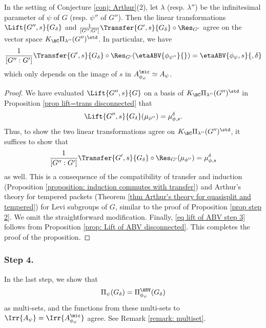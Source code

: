 \documentclass[11pt,letterpaper]{amsart}
\numberwithin{equation}{section}
\begin{document}
\begin{proposition}\label{prop step two}
In the setting of Conjecture \ref{conj: Arthur}(2), let $\lambda$ (resp. $\lambda''$) be the infinitesimal parameter of $\psi$ of $G$ (resp. $\psi''$ of $G''$). Then the linear transformations $\Lift{G'',s}{G_{\delta}}$ and $\frac{1}{[G'':G']} \Transfer{G',s}{G_{\delta}} \circ \Res_{G'}$ agree on the vector space $ K_{\BC}\Pi_{\lambda''}(G'')^{\std}$. In particular, we have 
\begin{align}\label{eq lift of ABV step 3}
    \frac{1}{[G'':G']} \Transfer{G',s}{G_{\delta}} \circ \Res_{G'} (\etaABV{\phi_{\psi''}}{}) = \etaABV{\phi_{\psi},s}{,\delta}
\end{align}
which only depends on the image of $s$ in $A_{\phi_{\psi}}^{\mic}\simeq A_{\psi}$.
\end{proposition}
\begin{proof}
We have evaluated $\Lift{G'',s}{G}$ on a basis of $ K_{\BC}\Pi_{\lambda''}(G'')^{\std}$ in  Proposition \ref{prop lift=trans disconnected} that
\[\Lift{G'',s}{G_{\delta}} (\mu_{\phi''})= \mu_{\phi,s}^{\delta}. \]
Thus, to show the two linear transformations agree on  $ K_{\BC}\Pi_{\lambda''}(G'')^{\std}$,
it suffices to show that 
\[\frac{1}{[G'':G']} \Transfer{G',s}{G_{\delta}} \circ \Res_{G'} (\mu_{\phi''})= \mu_{\phi,s}^{\delta}\]
as well. This is a consequence of the compatibility of transfer and induction (Proposition \ref{proposition: induction commutes with transfer}) and Arthur's theory for tempered packets (Theorem \ref{thm Arthur's theory for quasisplit and tempered}) for Levi subgroups of $G$, similar to the proof of Proposition \ref{prop step 2}. We omit the straightforward modification. Finally, \eqref{eq lift of ABV step 3} follows from Proposition \ref{prop: Lift of ABV disconnected}. This completes the proof of the proposition.
\end{proof}


\subsubsection{\bf Step 4.}
In the last step, we show that
\[ \Pi_{\psi}(G_{\delta})= \Pi_{\phi_{\psi}}^{\ABV}(G_{\delta})\]
as multi-sets, and the functions from these multi-sets to $\Irr{A_{\psi}} = \Irr{A_{\phi_{\psi}}^{\mic}}$ agree.
See Remark \ref{remark: multiset}.
\end{document}
